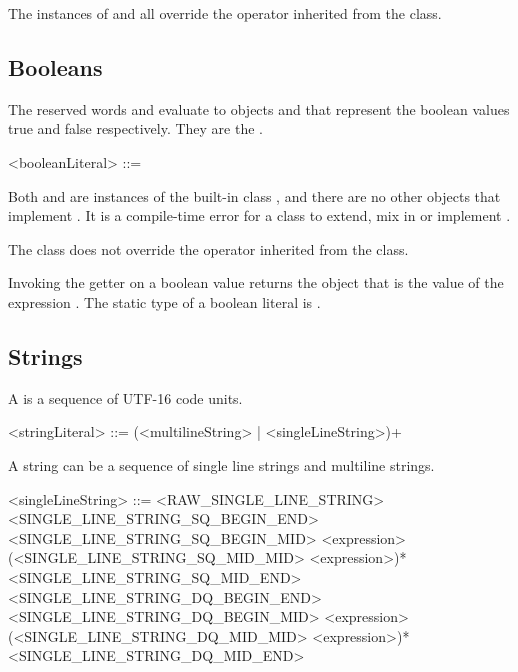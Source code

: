 \documentclass[makeidx]{article}
\begin{document}
{\LMHash{}%
The instances of  and  all override the \lit{==} operator inherited from the  class.


\subsection{Booleans}

\LMHash{}%
The reserved words \TRUE{} and \FALSE{} evaluate to objects
 and
that represent the boolean values true and false respectively.
They are the .

\begin{grammar}
<booleanLiteral> ::= \TRUE{}
  \alt \FALSE{}
\end{grammar}

\LMHash{}%
Both  and  are instances of
the built-in class ,
and there are no other objects that implement .
It is a compile-time error for a class to
extend, mix in or implement .

\LMHash{}%
The  class does not override the \lit{==} operator inherited from
the  class.

\LMHash{}%
Invoking the getter  on a boolean value returns the  object that is the value of the expression .
The static type of a boolean literal is .


\subsection{Strings}

\LMHash{}%
A  is a sequence of UTF-16 code units.


\begin{grammar}
<stringLiteral> ::= (<multilineString> | <singleLineString>)+
\end{grammar}

\LMHash{}%
A string can be a sequence of single line strings and multiline strings.

\begin{grammar}
<singleLineString> ::= <RAW\_SINGLE\_LINE\_STRING>
  \alt <SINGLE\_LINE\_STRING\_SQ\_BEGIN\_END>
  \alt <SINGLE\_LINE\_STRING\_SQ\_BEGIN\_MID> <expression> \gnewline{}
       (<SINGLE\_LINE\_STRING\_SQ\_MID\_MID> <expression>)* \gnewline{}
       <SINGLE\_LINE\_STRING\_SQ\_MID\_END>
  \alt <SINGLE\_LINE\_STRING\_DQ\_BEGIN\_END>
  \alt <SINGLE\_LINE\_STRING\_DQ\_BEGIN\_MID> <expression> \gnewline{}
       (<SINGLE\_LINE\_STRING\_DQ\_MID\_MID> <expression>)* \gnewline{}
       <SINGLE\_LINE\_STRING\_DQ\_MID\_END>


\end{grammar}}
\end{document}
